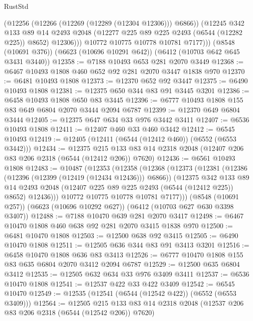\begin{lexlean}{RustStd}
\begin{coremodule}
              (@12256 (@12266 (@12269 (@12289 (@12304 @12306))) @6866))
              (@12245
                @342
                @133
                @89
                @14
                @2493
                @2048
                (@12277 @225 @89 @225 @2493 (@6544 (@12282 @225)) @8652)
                @12306)))
          @10772
          @10775
          @10778
          @10781
          @7177)))
    (@8548 (@10691 @376))
    (@6623 (@10696 @10291 @642))
    (@6412 (@10703 @642 @645 @3431 @3440))
@12358 := @7188 @10493 @653 @281 @2070 @3449
@12368 := @6467 @10493 @1808 @460 @652 @92 @281 @2070 @3447 @1838 @970
@12370 := @6481 @10493 @1808
@12373 := @12370 @652 @92 @3447
@12375 := @6490 @10493 @1808
@12381 := @12375 @650 @344 @83 @91 @3445 @3201
@12386 := @6458 @10493 @1808 @650 @83 @3445
@12396 := @6777 @10493 @1808 @155 @83 @649 @6804 @2070 @3444 @2094 @6787
@12399 := @12370 @649 @6804 @3444
@12405 := @12375 @647 @634 @33 @976 @3442 @3411
@12407 := @6536 @10493 @1808
@12411 := @12407 @460 @33 @460 @3442
@12412 := @6545 @10493
@12419 := @12405 (@12411 (@6544 (@12412 @460)) (@6552 (@6553 @3442)))
@12434 := @12375
    @215
    @133
    @83
    @14
    @2318
    @2048
    (@12407 @206 @83 @206 @2318 (@6544 (@12412 @206)) @7620)
@12436 := @6561 @10493 @1808
@12483 := @10487
    (@12353
      (@12358
        (@12368
          (@12373
            (@12381
              (@12386 (@12396 (@12399 (@12419 (@12434 @12436))) @6866))
              (@12375
                @342
                @133
                @89
                @14
                @2493
                @2048
                (@12407 @225 @89 @225 @2493 (@6544 (@12412 @225)) @8652)
                @12436)))
          @10772
          @10775
          @10778
          @10781
          @7177)))
    (@8548 (@10691 @257))
    (@6623 (@10696 @10292 @627))
    (@6412 (@10703 @627 @630 @3398 @3407))
@12488 := @7188 @10470 @639 @281 @2070 @3417
@12498 := @6467 @10470 @1808 @460 @638 @92 @281 @2070 @3415 @1838 @970
@12500 := @6481 @10470 @1808
@12503 := @12500 @638 @92 @3415
@12505 := @6490 @10470 @1808
@12511 := @12505 @636 @344 @83 @91 @3413 @3201
@12516 := @6458 @10470 @1808 @636 @83 @3413
@12526 := @6777 @10470 @1808 @155 @83 @635 @6804 @2070 @3412 @2094 @6787
@12529 := @12500 @635 @6804 @3412
@12535 := @12505 @632 @634 @33 @976 @3409 @3411
@12537 := @6536 @10470 @1808
@12541 := @12537 @422 @33 @422 @3409
@12542 := @6545 @10470
@12549 := @12535 (@12541 (@6544 (@12542 @422)) (@6552 (@6553 @3409)))
@12564 := @12505
    @215
    @133
    @83
    @14
    @2318
    @2048
    (@12537 @206 @83 @206 @2318 (@6544 (@12542 @206)) @7620)

\end{coremodule}
\end{lexlean}
